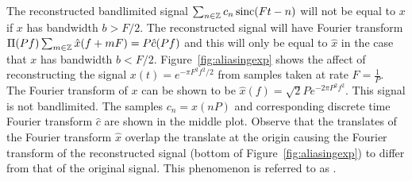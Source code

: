 The reconstructed bandlimited signal $\sum_{n \in {\mathbb Z}} c_n \operatorname{sinc}(Ft - n)$ will not be equal to $x$ if $x$ has bandwidth $b > F/2$.  The reconstructed signal will have Fourier transform $\Pi(Pf) \sum_{m \in {\mathbb Z}} \hat{x}(f + mF) = P \hat{c}(Pf)$ and this will only be equal to $\hat{x}$ in the case that $x$ has bandwidth $b < F/2$.  Figure~\ref{fig:aliasingexp} shows the affect of reconstructing the signal $x(t) = e^{-\pi F^2 f^2/2}$ from samples taken at rate $F = \tfrac{1}{P}$.  The Fourier transform of $x$ can be shown to be $\hat{x}(f) = \sqrt{2} P e^{-2 \pi P^2 f^2}$.  This signal is not bandlimited.  The samples $c_n = x(nP)$ and corresponding discrete time Fourier transform $\hat{c}$ are shown in the middle plot.  Observe that the translates of the Fourier transform $\hat{x}$ overlap the translate at the origin causing the Fourier transform of the reconstructed signal (bottom of Figure~\ref{fig:aliasingexp}) to differ from that of the original signal.  This phenomenon is referred to as .




